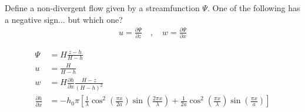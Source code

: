 Define a non-divergent flow given by a streamfunction $\Psi$.  One of the following has a negative sign... but which one?
\begin{align}
u = \frac{\partial \Psi}{\partial z} \quad,\quad w = \frac{\partial \Psi}{\partial x}
\end{align}

\begin{align}
\Psi &= H \frac{z - h}{H - h} \\
u &= \frac{H}{H - h} \\
w &= H \frac{\partial h}{\partial x} \frac{H - z}{\left( H - h \right)^2} \\
\frac{\partial h}{\partial x} &= - h_0 \pi \left[ 
	\frac{1}{\lambda} \cos^2 \left( \frac{\pi x}{2a} \right) \sin \left( \frac{2 \pi x}{\lambda} \right) +
	\frac{1}{2a} \cos^2 \left( \frac{\pi x}{\lambda} \right) \sin \left( \frac{\pi x}{a} \right)
\right]
\end{align}
